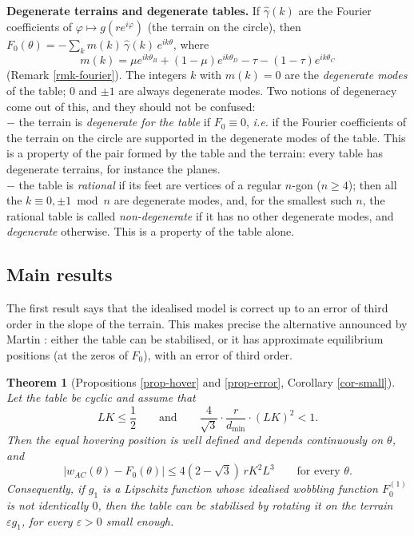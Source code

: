 \documentclass[a4paper,11pt,twoside,leqno]{article}
\newtheorem{teoalph}{Theorem}
\newcommand{\ie}[0]{\emph{i.e.} }
\newcommand{\eps}[0]{\varepsilon}
\numberwithin{equation}{section}
\begin{document}
\textbf{Degenerate terrains and degenerate tables.} If $\hat\gamma(k)$ are the Fourier coefficients of $\varphi \mapsto g(re^{i\varphi})$ (the terrain on the circle), then $F_0(\theta) = -\sum_k m(k)\, \hat\gamma(k)\, e^{ik\theta}$, where
\[
m(k) = \mu e^{ik\theta_B} + (1-\mu) e^{ik\theta_D} - \tau - (1-\tau) e^{ik\theta_C}
\]
(Remark \ref{rmk-fourier}). The integers $k$ with $m(k) = 0$ are the \emph{degenerate modes} of the table; $0$ and $\pm 1$ are always degenerate modes. Two notions of degeneracy come out of this, and they should not be confused:\\
$-$ \; the terrain is \emph{degenerate for the table} if $F_0 \equiv 0$, \ie if the Fourier coefficients of the terrain on the circle are supported in the degenerate modes of the table. This is a property of the pair formed by the table and the terrain: every table has degenerate terrains, for instance the planes.\\
$-$ \; the table is \emph{rational} if its feet are vertices of a regular $n$-gon ($n \geq 4$); then all the $k \equiv 0, \pm 1 \bmod n$ are degenerate modes, and, for the smallest such $n$, the rational table is called \emph{non-degenerate} if it has no other degenerate modes, and \emph{degenerate} otherwise. This is a property of the table alone.

\subsection{Main results}\label{ss-intro-results}

The first result says that the idealised model is correct up to an error of third order in the slope of the terrain. This makes precise the alternative announced by Martin \cite[\S{}4]{Mar}: either the table can be stabilised, or it has approximate equilibrium positions (at the zeros of $F_0$), with an error of third order.

\begin{teoalph}[Propositions \ref{prop-hover} and \ref{prop-error}, Corollary \ref{cor-small}]\label{thmA}
Let the table be cyclic and assume that
\[
LK \leq \frac{1}{2}
\qquad \text{and} \qquad
\frac{4}{\sqrt{3}} \cdot \frac{r}{d_{\min}} \cdot (LK)^2 < 1.
\]
Then the equal hovering position is well defined and depends continuously on $\theta$, and
\[
|w_{AC}(\theta) - F_0(\theta)| \leq 4(2-\sqrt{3})\, r K^2 L^3 \qquad \text{for every } \theta.
\]
Consequently, if $g_1$ is a Lipschitz function whose idealised wobbling function $F_0^{(1)}$ is not identically $0$, then the table can be stabilised by rotating it on the terrain $\eps g_1$, for every $\eps > 0$ small enough.
\end{teoalph}
\end{document}

